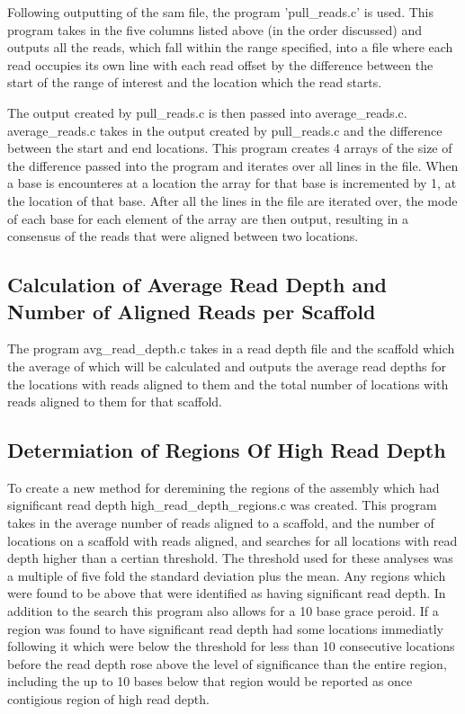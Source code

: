 \documentclass[../main.tex]{subfiles}
\begin{document}
	Following outputting of the sam file, the program 'pull\_reads.c' is used. This program takes in the five columns listed above (in the order discussed) and outputs all the reads, which fall within the range specified, into a file where each read occupies its own line with each read offset by the difference between the start of the range of interest and the location which the read starts.
	
	The output created by pull\_reads.c is then passed into average\_reads.c. average\_reads.c takes in the output created by pull\_reads.c and the difference between the start and end locations. This program creates 4 arrays of the size of the difference passed into the program and iterates over all lines in the file. When a base is encounteres at a location the array for that base is incremented by 1, at the location of that base. After all the lines in the file are iterated over, the mode of each base for each element of the array are then output, resulting in a consensus of the reads that were aligned between two locations.

\subsection{Calculation of Average Read Depth and Number of Aligned Reads per Scaffold}
	The program avg\_read\_depth.c takes in a read depth file and the scaffold which the average of which will be calculated and outputs the average read depths for the locations with reads aligned to them and the total number of locations with reads aligned to them for that scaffold.

\subsection{Determiation of Regions Of High Read Depth}
	To create a new method for deremining the regions of the assembly which had significant read depth high\_read\_depth\_regions.c was created. This program takes in the average number of reads aligned to a scaffold, and the number of locations on a scaffold with reads aligned, and searches for all locations with read depth higher than a certian threshold. The threshold used for these analyses was a multiple of five fold the standard deviation plus the mean. Any regions which were found to be above that were identified as having significant read depth. In addition to the search this program also allows for a 10 base grace peroid. If a region was found to have significant read depth had some locations immediatly following it which were below the threshold for less than 10 consecutive locations before the read depth rose above the level of significance than the entire region, including the up to 10 bases below that region would be reported as once contigious region of high read depth.
\end{document}
